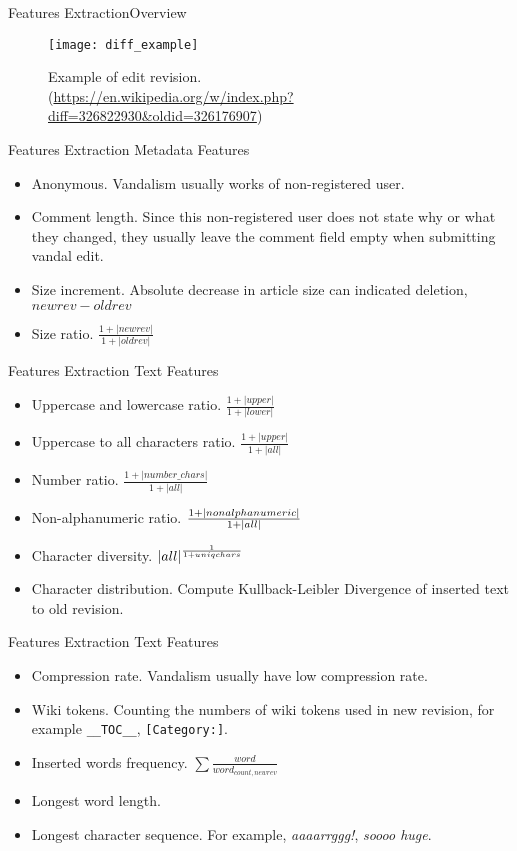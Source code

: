 \documentclass{beamer}
\begin{document}
\begin{frame}{Features Extraction}{Overview}
	\begin{figure}
		\centering
		\texttt{[image: diff\_example]}
		\caption{
			Example of edit revision.\\
			(\url{https://en.wikipedia.org/w/index.php?diff=326822930&oldid=326176907})
		}
	\end{figure}
\end{frame}


\begin{frame}
	{Features Extraction}
	{Metadata Features}
	\begin{itemize}
		\item Anonymous. Vandalism usually works of non-registered user.
		\item Comment length. Since this non-registered user does not state why
		or what they changed, they usually leave the comment field empty when
		submitting vandal edit.
		\item Size increment. Absolute decrease in article size can indicated
		deletion, $ newrev - oldrev $
		\item Size ratio.
			$ \frac{1+|newrev|}{1+|oldrev|} $
	\end{itemize}
\end{frame}

\begin{frame}
	{Features Extraction}
	{Text Features}
	\begin{itemize}
		\item Uppercase and lowercase ratio.
			$ \frac{1+|upper|}{1+|lower|} $
		\item Uppercase to all characters ratio.
			$ \frac{1+|upper|}{1+|all|} $
		\item Number ratio.
			$ \frac{1+|number\_chars|}{1+|all|} $
		\item Non-alphanumeric ratio.
			$ \frac{1+|non\-alphanumeric|}{1+|all|} $
		\item Character diversity.
			$ {|all|}^{\frac{1}{1+uniq\-chars}} $
		\item Character distribution. Compute Kullback-Leibler Divergence of
		inserted text to old revision.
	\end{itemize}
\end{frame}

\begin{frame}
	{Features Extraction}
	{Text Features}
	\begin{itemize}
		\item Compression rate. Vandalism usually have low compression rate.
		\item Wiki tokens. Counting the numbers of wiki tokens used in new
		revision, for example \texttt{\_\_TOC\_\_}, \texttt{[Category:]}.
		\item Inserted words frequency.
			$ \sum{\frac{word}{word_{count,newrev}}} $
		\item Longest word length.
		\item Longest character sequence. For example, \textit{aaaarrggg!},
		\textit{soooo huge}.
	\end{itemize}
\end{frame}
\end{document}

